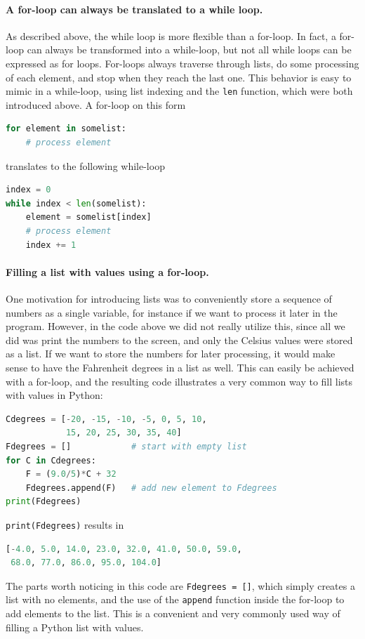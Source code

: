 \documentclass[graybox,envcountchap,sectrefs,final]{svmonodo}
\begin{document}
\paragraph{A for-loop can always be translated to a while loop.}
As described above, the while loop is more flexible than a for-loop. In fact, a for-loop can always be transformed into a
while-loop, but not all while loops can be expressed as for loops.
For-loops always traverse through lists, do some processing of each element, and stop when they reach the last one. This behavior is
easy to mimic in a while-loop, using list indexing and the \texttt{len} function, which were both introduced above. A for-loop on this
form
\begin{lstlisting}[language=Python,style=blue1]
for element in somelist:
    # process element
\end{lstlisting}
translates to the following while-loop
\begin{lstlisting}[language=Python,style=blue1]
index = 0
while index < len(somelist):
    element = somelist[index]
    # process element
    index += 1
\end{lstlisting}

\paragraph{Filling a list with values using a for-loop.}
One motivation for introducing lists was to conveniently store a sequence of numbers as a single variable, for instance if we want
to process it later in the program. However, in the code above we did not really utilize this, since all we did was print the numbers
to the screen, and only the Celsius values were stored as a list. If we want to store the numbers for later processing, it would make
sense to have the Fahrenheit degrees in a list as well. This can easily be achieved with a for-loop, and the resulting code illustrates
a very common way to fill lists with values in Python:
\begin{lstlisting}[language=Python,style=blue1]
Cdegrees = [-20, -15, -10, -5, 0, 5, 10,
            15, 20, 25, 30, 35, 40]
Fdegrees = []            # start with empty list
for C in Cdegrees:
    F = (9.0/5)*C + 32
    Fdegrees.append(F)   # add new element to Fdegrees
print(Fdegrees)
\end{lstlisting}
\texttt{print(Fdegrees)} results in

\begin{lstlisting}[language=Python,style=blue1]
[-4.0, 5.0, 14.0, 23.0, 32.0, 41.0, 50.0, 59.0,
 68.0, 77.0, 86.0, 95.0, 104.0]
\end{lstlisting}
The parts worth noticing in this code are \texttt{Fdegrees = []}, which simply creates a list with no elements, and
the use of the \texttt{append} function inside the for-loop to add elements to
the list. This is a convenient and very commonly used way of filling a Python list with values.
\end{document}
